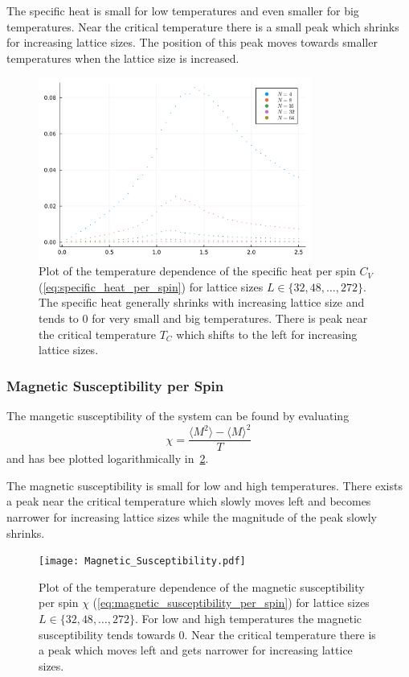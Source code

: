 The specific heat is small for low temperatures and even smaller for big temperatures. Near the critical temperature there is a small peak which shrinks for increasing lattice sizes. The position of this peak moves towards smaller temperatures when the lattice size is increased. 
\begin{figure}[!htb]
	\centering
	\includegraphics[width=0.8\textwidth]{Specific_Heat.pdf}
	\caption[Temperature dependence of the specifc heat per spin $C_V$]{Plot of the temperature dependence of the specific heat per spin $C_V$ (\cref{eq:specific_heat_per_spin}) for lattice sizes $L\in\{32, 48, \dots, 272\}$. The specific heat generally shrinks with increasing lattice size and tends to $0$ for very small and big temperatures. There is peak near the critical temperature $T_C$ which shifts to the left for increasing lattice sizes.}
	\label{fig:specific_heat}
\end{figure}

\subsubsection{Magnetic Susceptibility per Spin}\label{sec:magnetic_susceptibility_per_spin}
The mangetic susceptibility of the system can be found by evaluating
\begin{equation}\label{eq:magnetic_susceptibility_per_spin}
	\chi = \frac{\langle M^2 \rangle - {\langle M \rangle}^2}{T}
\end{equation}
and has bee plotted logarithmically in~\cref{fig:magnetic_susceptibility}.

The magnetic susceptibility is small for low and high temperatures. There exists a peak near the critical temperature which slowly moves left and becomes narrower for increasing lattice sizes while the magnitude of the peak slowly shrinks.
\begin{figure}[!htb]
	\centering
	\texttt{[image: Magnetic\_Susceptibility.pdf]}
	\caption[Temperature dependence of the mangetic susceptibility per spin $\chi$]{Plot of the temperature dependence of the magnetic susceptibility per spin $\chi$ (\cref{eq:magnetic_susceptibility_per_spin}) for lattice sizes $L\in\{32, 48, \dots, 272\}$. For low and high temperatures the magnetic susceptibility tends towards $0$. Near the critical temperature there is a peak which moves left and gets narrower for increasing lattice sizes.}
	\label{fig:magnetic_susceptibility}
\end{figure}

